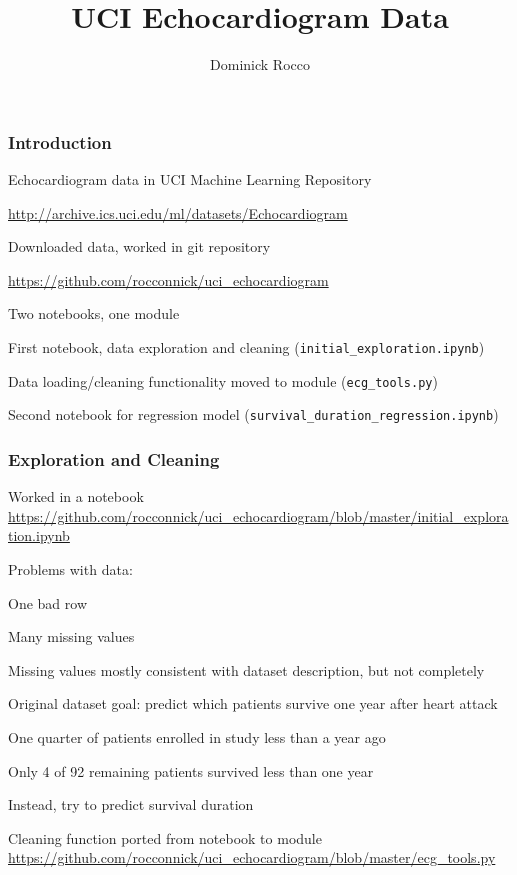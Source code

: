 \documentclass[10pt,professionalfonts,xcolor=table]{beamer}
\title{UCI Echocardiogram Data}
\author[Rocco]{Dominick Rocco}
\begin{document}



\begin{frame}[plain]
\titlepage
\end{frame}


\begin{frame}[fragile]
\frametitle{Introduction}
  \bangon
  \item Echocardiogram data in UCI Machine Learning Repository
  \bangon
    \item \url{http://archive.ics.uci.edu/ml/datasets/Echocardiogram}
  \bangoff
  \gap
  \item Downloaded data, worked in git repository
    \bangon
    \item \url{https://github.com/rocconnick/uci_echocardiogram}
    \bangoff
  \gap
  \item Two notebooks, one module
    \bangon
    \item First notebook, data exploration and cleaning (\verb!initial_exploration.ipynb!)
    \item Data loading/cleaning functionality moved to module (\verb!ecg_tools.py!)
    \item Second notebook for regression model (\verb!survival_duration_regression.ipynb!)
    \bangoff
  \bangoff
\end{frame}


\begin{frame}[fragile]
\frametitle{Exploration and Cleaning}
  \bangon
  \item Worked in a notebook
    \bangon
    \bong \url{https://github.com/rocconnick/uci_echocardiogram/blob/master/initial_exploration.ipynb}
    \bangoff
  \gap
  \item Problems with data:
  \bangon
    \item One bad row
    \item Many missing values
    \item Missing values mostly consistent with dataset description, but not completely
  \bangoff
  \gap
  \item Original dataset goal: predict which patients survive one year after heart attack
  \bangon
  \item One quarter of patients enrolled in study less than a year ago
  \item Only 4 of 92 remaining patients survived less than one year
  \bangoff
  \gap
  \item Instead, try to predict survival duration
  \gap
  \item Cleaning function ported from notebook to module
    \bangon
    \bong \url{https://github.com/rocconnick/uci_echocardiogram/blob/master/ecg_tools.py}
    \bangoff

  \bangoff
\end{frame}
\end{document}
